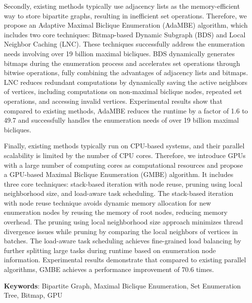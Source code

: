 Secondly, existing methods typically use adjacency lists as the memory-efficient way to store bipartite graphs, resulting in inefficient set operations. Therefore, we propose an Adaptive Maximal Biclique Enumeration (AdaMBE) algorithm, which includes two core techniques: Bitmap-based Dynamic Subgraph (BDS) and Local Neighbor Caching (LNC). These techniques successfully address the enumeration needs involving over 19 billion maximal bicliques. BDS dynamically generates bitmaps during the enumeration process and accelerates set operations through bitwise operations, fully combining the advantages of adjacency lists and bitmaps. LNC reduces redundant computations by dynamically saving the active neighbors of vertices, including computations on non-maximal biclique nodes, repeated set operations, and accessing invalid vertices. Experimental results show that compared to existing methods, AdaMBE reduces the runtime by a factor of 1.6 to 49.7 and successfully handles the enumeration needs of over 19 billion maximal bicliques.

Finally, existing methods typically run on CPU-based systems, and their parallel scalability is limited by the number of CPU cores. Therefore, we introduce GPUs with a large number of computing cores as computational resources and propose a GPU-based Maximal Biclique Enumeration (GMBE) algorithm. It includes three core techniques: stack-based iteration with node reuse, pruning using local neighborhood size, and load-aware task scheduling. The stack-based iteration with node reuse technique avoids dynamic memory allocation for new enumeration nodes by reusing the memory of root nodes, reducing memory overhead. The pruning using local neighborhood size approach minimizes thread divergence issues while pruning by comparing the local neighbors of vertices in batches. The load-aware task scheduling achieves fine-grained load balancing by further splitting large tasks during runtime based on enumeration node information. Experimental results demonstrate that compared to existing parallel algorithms, GMBE achieves a performance improvement of 70.6 times.

\vspace{\baselineskip}

\noindent \textbf{Keywords}: Bipartite Graph, Maximal Biclique Enumeration, Set Enumeration Tree, Bitmap, GPU